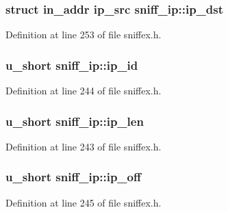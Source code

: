 \subsubsection[{\texorpdfstring{ip\+\_\+dst}{ip_dst}}]{\setlength{\rightskip}{0pt plus 5cm}struct in\+\_\+addr ip\+\_\+src sniff\+\_\+ip\+::ip\+\_\+dst}\hypertarget{structsniff__ip_ad2db4a1d3fbfb1bcc44e5a26d6c28c2e}{}\label{structsniff__ip_ad2db4a1d3fbfb1bcc44e5a26d6c28c2e}


Definition at line 253 of file sniffex.\+h.

\subsubsection[{\texorpdfstring{ip\+\_\+id}{ip_id}}]{\setlength{\rightskip}{0pt plus 5cm}u\+\_\+short sniff\+\_\+ip\+::ip\+\_\+id}\hypertarget{structsniff__ip_a9cae00d3f7491ce2bfcb086880b1aa6a}{}\label{structsniff__ip_a9cae00d3f7491ce2bfcb086880b1aa6a}


Definition at line 244 of file sniffex.\+h.

\subsubsection[{\texorpdfstring{ip\+\_\+len}{ip_len}}]{\setlength{\rightskip}{0pt plus 5cm}u\+\_\+short sniff\+\_\+ip\+::ip\+\_\+len}\hypertarget{structsniff__ip_aa4907e31555a52a20bc0eadc46d45044}{}\label{structsniff__ip_aa4907e31555a52a20bc0eadc46d45044}


Definition at line 243 of file sniffex.\+h.

\subsubsection[{\texorpdfstring{ip\+\_\+off}{ip_off}}]{\setlength{\rightskip}{0pt plus 5cm}u\+\_\+short sniff\+\_\+ip\+::ip\+\_\+off}\hypertarget{structsniff__ip_aecf13449d60d1e0b7d78a64fcd3e54de}{}\label{structsniff__ip_aecf13449d60d1e0b7d78a64fcd3e54de}


Definition at line 245 of file sniffex.\+h.

